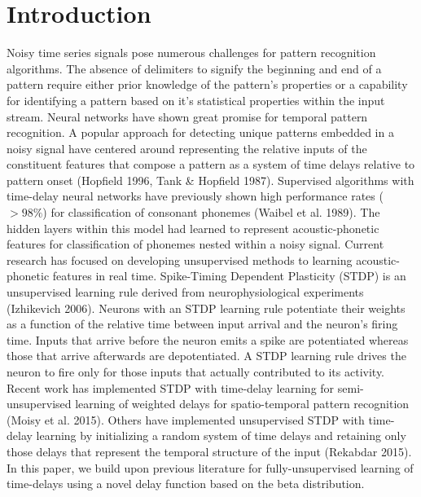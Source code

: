 \documentclass{article}
\begin{document}
\section*{Introduction}
Noisy time series signals pose numerous challenges for pattern recognition algorithms.  The absence of delimiters to signify the beginning and end of a pattern require either prior knowledge of the pattern's properties or a capability for identifying a pattern based on it's statistical properties within the input stream. Neural networks have shown great promise for temporal pattern recognition.  A popular approach for detecting unique patterns embedded in a noisy signal have centered around representing the relative inputs of the constituent features that compose a pattern as a system of time delays relative to pattern onset (Hopfield 1996, Tank \& Hopfield 1987). Supervised algorithms with time-delay neural networks have previously shown high performance rates ($>98\%$) for classification of consonant phonemes (Waibel et al. 1989). The hidden layers within this model had learned to represent acoustic-phonetic features for classification of phonemes nested  within a noisy signal.  Current research has focused on developing unsupervised methods to learning acoustic-phonetic features in real time.  Spike-Timing Dependent Plasticity (STDP) is an unsupervised learning rule derived from neurophysiological experiments (Izhikevich 2006).  Neurons with an STDP learning rule potentiate their weights as a function of the relative time between input arrival and the neuron's firing time.  Inputs that arrive before the neuron emits a spike are potentiated whereas those that arrive afterwards are depotentiated. A STDP learning rule drives the neuron to fire only for those inputs that actually contributed to its activity. Recent work has implemented STDP with time-delay learning for semi-unsupervised learning of weighted delays for spatio-temporal pattern recognition (Moisy et al. 2015).  Others have implemented unsupervised STDP with time-delay learning by initializing a random system of time delays and retaining only those delays that represent the temporal structure of the input (Rekabdar 2015). In this paper, we build upon previous literature for fully-unsupervised learning of time-delays using a novel delay function based on the beta distribution.

\end{document}
